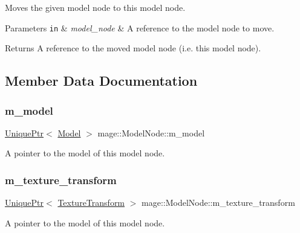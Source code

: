 Moves the given model node to this model node.


\begin{DoxyParams}[1]{Parameters}
\mbox{\tt in}  & {\em model\+\_\+node} & A reference to the model node to move. \\
\hline
\end{DoxyParams}
\begin{DoxyReturn}{Returns}
A reference to the moved model node (i.\+e. this model node). 
\end{DoxyReturn}


\subsection{Member Data Documentation}
\hypertarget{classmage_1_1_model_node_a784faf19f736a1c74808321ed0e52d36}{}\label{classmage_1_1_model_node_a784faf19f736a1c74808321ed0e52d36} 
\subsubsection{\texorpdfstring{m\+\_\+model}{m\_model}}
{\footnotesize\ttfamily \hyperlink{namespacemage_a3316d7143a973e37adf1110f2e80ca31}{Unique\+Ptr}$<$ \hyperlink{classmage_1_1_model}{Model} $>$ mage\+::\+Model\+Node\+::m\+\_\+model\hspace{0.3cm}{\ttfamily [private]}}

A pointer to the model of this model node. \hypertarget{classmage_1_1_model_node_a24888374dcf3e1fdba4a3a0790931a0a}{}\label{classmage_1_1_model_node_a24888374dcf3e1fdba4a3a0790931a0a} 
\subsubsection{\texorpdfstring{m\+\_\+texture\+\_\+transform}{m\_texture\_transform}}
{\footnotesize\ttfamily \hyperlink{namespacemage_a3316d7143a973e37adf1110f2e80ca31}{Unique\+Ptr}$<$ \hyperlink{classmage_1_1_texture_transform}{Texture\+Transform} $>$ mage\+::\+Model\+Node\+::m\+\_\+texture\+\_\+transform\hspace{0.3cm}{\ttfamily [private]}}

A pointer to the model of this model node. 